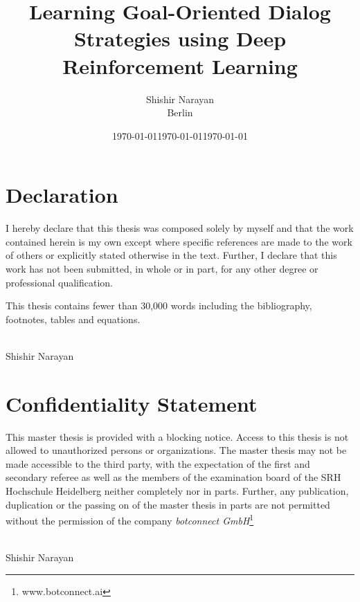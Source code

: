 \documentclass[14pt]{extarticle}
\numberwithin{equation}{section}
\begin{document}
	
	
	
	
	\title{Learning Goal-Oriented Dialog Strategies using Deep Reinforcement Learning}
	\author{Shishir Narayan \\ Berlin}
	\date{\today}
	

	
	\maketitle
	\clearpage

	\setcounter{page}{1}
\section*{Declaration}
I hereby declare that this thesis was composed solely by myself and that the work contained herein is my own except where specific references are made to the work of others or explicitly stated otherwise in the text. Further, I declare that this work has not been submitted, in whole or in part, for any other degree or professional qualification.

This thesis contains fewer than 30,000 words including the bibliography, footnotes, tables and equations.
\\\\
\begin{flushright}
Shishir Narayan\\
\date{\today}
\end{flushright}
\clearpage
\section*{Confidentiality Statement}
This master thesis is provided with a blocking notice. Access to this thesis is not allowed to unauthorized persons or organizations. The master thesis may not be made accessible to the third party, with the expectation of the first and secondary referee as well as the members of the examination board of the SRH Hochschule Heidelberg neither completely nor in parts.
Further, any publication, duplication or the passing on of the master thesis in parts are not permitted without the permission of the company \textit{botconnect GmbH}\footnote{www.botconnect.ai}
\\\\
\begin{flushright}
	Shishir Narayan\\
	\date{\today}
\end{flushright}
\clearpage
\end{document}
